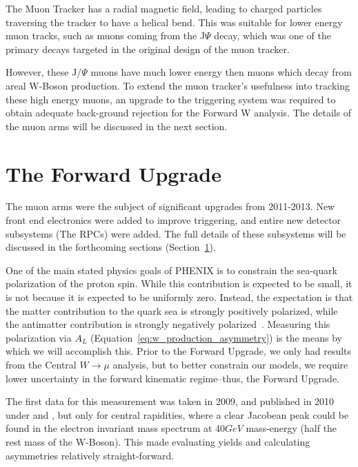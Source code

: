 The Muon Tracker has a radial magnetic field, leading to charged particles
traversing the tracker to have a helical bend. This was suitable for lower
energy muon tracks, such as muons coming from the J$\Psi$ decay, which was one
of the primary decays targeted in the original design of the muon tracker.

However, these J/$\Psi$ muons have much lower energy then muons which decay from
areal W-Boson production. To extend the muon tracker's usefulness into tracking
these high energy muons, an upgrade to the triggering system was required to
obtain adequate back-ground rejection for the Forward W analysis. The details of
the muon arms will be discussed in the next section.

\clearpage
\section{The Forward Upgrade} 
\label{sec:forward_upgrade}

The muon arms were the subject of significant upgrades from 2011-2013.
New front end electronics were added to improve triggering, and entire new
detector subsystems (The RPCs) were added. The full details of these subsystems
will be discussed in the forthcoming sections (Section~\ref{sec:forward_upgrade}).

One of the main stated physics goals of PHENIX is to constrain the sea-quark
polarization of the proton spin. While this contribution is
expected to be small, it is not because it is expected to be uniformly zero.
Instead, the expectation is that the matter contribution to the quark sea is
strongly positively polarized, while the antimatter contribution is strongly
negatively polarized~\cite{Aidala2005}. Measuring this polarization via $A_L$
(Equation~\ref{eq:w_production_asymmetry}) is the means by which we will
accomplish this. Prior to the Forward Upgrade, we only had results from the
Central $W\rightarrow\mu$ analysis, but to better constrain our models, we
require lower uncertainty in the forward kinematic regime--thus, the Forward
Upgrade.

The first data for this measurement was taken in 2009, and published in 2010
under \cite{Adare2010} and \cite{Okada2010}, but only for central rapidities,
where a clear Jacobean peak could be found in the electron invariant mass
spectrum at 40$GeV$ mass-energy (half the rest mass of the W-Boson). This made
evaluating yields and calculating asymmetries relatively straight-forward. 

